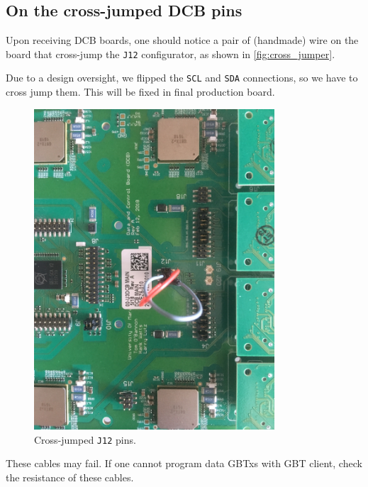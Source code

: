 \subsection{On the cross-jumped DCB pins}
\label{sec:cross_jumper}
Upon receiving DCB boards, one should notice a pair of (handmade) wire on the
board that cross-jump the \texttt{J12} configurator, as shown in
\autoref{fig:cross_jumper}.

Due to a design oversight, we flipped the \texttt{SCL} and \texttt{SDA}
connections, so we have to cross jump them.
This will be fixed in final production board.

\begin{figure}[ht]
    \centering
    \includegraphics[width=0.8\textwidth]{res/cross_jumper.jpg}
    \caption{Cross-jumped \texttt{J12} pins.}
    \label{fig:cross_jumper}
\end{figure}

\begin{leftbar}
    These cables may fail.
    If one cannot program data GBTxs with GBT client, check the resistance of
    these cables.
\end{leftbar}
